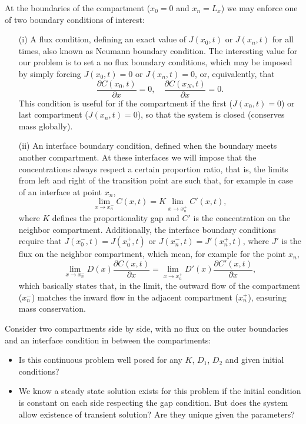 \documentclass[final,1p,times]{elsarticle}
\begin{document}
At the boundaries of the compartment ($x_0=0$ and $x_n=L_x$) we may enforce one of two boundary conditions of interest:
\begin{enumerate}
\item[(i)] A flux condition, defining an exact value of $J(x_0, t)$ or $J(x_n, t)$ for all times, also known as Neumann boundary condition. The interesting value for our problem is to set a no flux boundary conditions, which may be imposed by simply forcing $J(x_0, t)=0$ or $J(x_n, t)=0$, or, equivalently, that
\begin{equation}
\frac{\partial C(x_0,t)}{\partial x}=0, \quad \frac{\partial C(x_N,t)}{\partial x}=0.
\end{equation}
This condition is useful for if the compartment if the first ($J(x_0, t)=0$) or last compartment ($J(x_n, t)=0$), so that the system is closed (conserves mass globally).
\item[(ii)] An interface boundary condition, defined when the boundary meets another compartment. At these interfaces we will impose that the concentrations always respect a certain proportion ratio, that is, the limits from left and right of the transition point are such that, for example in case of an interface at point $x_n$, 
\begin{equation}
\lim_{x\rightarrow x_n^{-}} C(x, t) = K \lim_{x\rightarrow x_n^{+}} C'(x, t),
\end{equation}
where $K$ defines the proportionality gap and $C'$ is the concentration on the neighbor compartment.
Additionally, the interface boundary conditions require that $J(x_0^-, t)=J(x_0^+, t)$ or  $J(x_n^-, t)=J'(x_n^+, t)$, where $J'$ is the flux on the neighbor compartment, which mean, for example for the point $x_n$,
\begin{equation}
\lim_{x\rightarrow x_n^-}D(x) \frac{\partial C(x,t)}{\partial x} = \lim_{x\rightarrow x_n^+} D'(x) \frac{\partial C'(x,t)}{\partial x},
\end{equation}
which basically states that, in the limit, the outward flow of the compartment ($x_n^{-}$) matches the inward flow in the adjacent compartment ($x_n^{+}$), ensuring mass conservation.

\end{enumerate}

Consider two compartments side by side, with no flux on the outer boundaries and an interface condition in between the compartments:
\begin{itemize}
\item Is this continuous problem well posed for any $K$, $D_1$, $D_2$ and given initial conditions? 
\item We know a steady state solution exists for this problem if the initial condition is constant on each side respecting the gap condition. But does the system allow existence of transient solution? Are they unique given the parameters?

\end{itemize}
\end{document}
